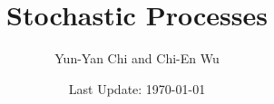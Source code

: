 \documentclass[a4paper, 10pt]{report}
\title{Stochastic Processes}
\author{Yun-Yan Chi and Chi-En Wu}
\date{Last Update: \today}
\begin{document}
\begin{CJK}{UTF8}{bsmi}

\maketitle
\tableofcontents


\printindex

\end{CJK}
\end{document}
